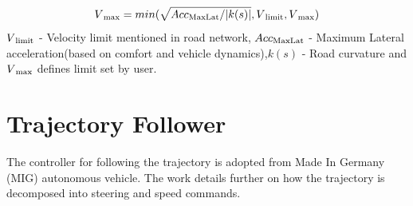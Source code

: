 \begin{equation}
    V\textsubscript{max} = min(\sqrt{Acc\textsubscript{MaxLat} / |k(s)|} , V\textsubscript{limit},V\textsubscript{max} )
\label{max_vel}
\end{equation}
$V\textsubscript{limit}$ - Velocity limit mentioned in road network,
$Acc\textsubscript{MaxLat}$ - Maximum Lateral acceleration(based on comfort and vehicle dynamics),$k(s)$ - Road curvature and $V\textsubscript{max}$ defines limit set by user.

\section{Trajectory Follower} \label{traj_follower}

The controller for following the trajectory is adopted from Made In Germany (MIG) autonomous vehicle. The work \cite{mig_controller} details further on how the trajectory is decomposed into steering and speed commands. 
